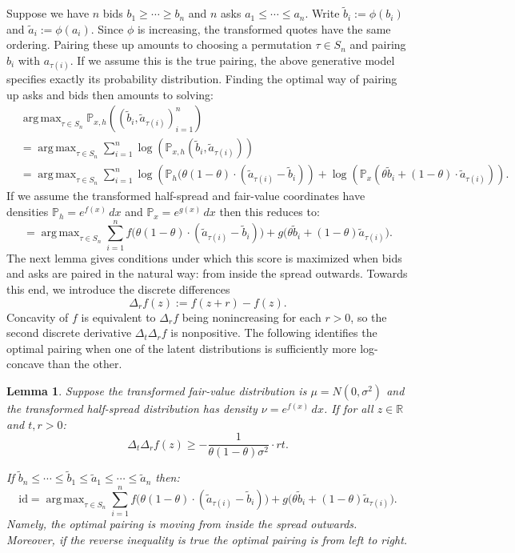 \documentclass[11pt]{article}
\theoremstyle{plain}
\newtheorem{lemma}[theorem]{Lemma}
\theoremstyle{definition}
\numberwithin{equation}{section}
\newcommand{\R}{\mathbb{R}}
\renewcommand{\P}{\mathbb{P}}
\DeclareMathOperator*{\argmax}{arg\,max}
\begin{document}
Suppose we have $n$ bids $b_1 \geq \cdots \geq b_n$ and $n$ asks $a_1 \leq \cdots \leq a_n$. Write $\widetilde b_i:=\phi(b_i)$ and $\widetilde a_i:=\phi(a_i)$. Since $\phi$ is increasing, the transformed quotes have the same ordering. Pairing these up amounts to choosing a permutation $\tau \in S_n$ and pairing $b_i$ with $a_{\tau(i)}$. If we assume this is the true pairing, the above generative model specifies exactly its probability distribution. Finding the optimal way of pairing up asks and bids then amounts to solving:
%
\begin{align*}
    & \argmax_{\tau \in S_n} \P_{x,h}\left((\widetilde b_i, \widetilde a_{\tau(i)})_{i=1}^n\right) \\
    & = \argmax_{\tau \in S_n} \sum_{i=1}^n \log\left(\P_{x,h}(\widetilde b_i, \widetilde a_{\tau(i)})\right) \\
    & = \argmax_{\tau \in S_n} \sum_{i=1}^n \log\left(\P_h(\theta (1-\theta) \cdot (\widetilde a_{\tau(i)} - \widetilde b_i)\right) + \log\left( \P_x(\theta \widetilde b_i + (1-\theta) \cdot \widetilde a_{\tau(i)})\right).
\end{align*}
%
\noindent If we assume the transformed half-spread and fair-value coordinates have densities $\P_h=e^{f(x)}\,dx$ and $\P_x=e^{g(x)}\,dx$ then this reduces to:
%
\[= \argmax_{\tau \in S_n} \sum_{i=1}^n f\Big(\theta(1-\theta) \cdot (\widetilde a_{\tau(i)} - \widetilde b_i) \Big ) + g\Big(\theta \widetilde b_i + (1-\theta) \widetilde a_{\tau(i)}\Big). \]
%
\noindent The next lemma gives conditions under which this score is maximized
when bids and asks are paired in the natural way: from inside the spread
outwards. Towards this end, we introduce the discrete differences
%
\[\Delta_r f(z) := f(z + r) - f(z).\]
%
\noindent Concavity of $f$ is equivalent to $\Delta_r f$ being nonincreasing for
each $r > 0$, so the second discrete derivative $\Delta_t \Delta_r f$ is
nonpositive. The following identifies the optimal pairing when one of the latent
distributions is sufficiently more log-concave than the other.

\begin{lemma}
    Suppose the transformed fair-value distribution is $\mu=N(0,\sigma^2)$ and the transformed half-spread distribution has density $\nu=e^{f(x)}\,dx$. If for all $z \in \R$
    and $t,r > 0$:
    \begin{equation}
         \Delta_t \Delta_r f(z) \geq - \frac{1}{\theta(1-\theta)\sigma^2} \cdot rt.
         \label{eqn:gaussian_concavity_condition}
    \end{equation}

    \noindent If $\widetilde b_n \leq \cdots \leq \widetilde b_1 \leq \widetilde a_1 \leq \cdots \leq \widetilde a_n$ then:
    \[\mathrm{id} = \argmax_{\tau \in S_n} \sum_{i=1}^n f\Big(\theta(1-\theta) \cdot (\widetilde a_{\tau(i)} - \widetilde b_i) \Big ) + g\Big(\theta \widetilde b_i + (1-\theta) \widetilde a_{\tau(i)}\Big). \]
    \noindent Namely, the optimal pairing is moving from inside the spread outwards.
     Moreover, if the reverse inequality is true the optimal pairing is from left to
     right.

    \label{lem:optimal_pairing_bids_and_asks_gaussian}
\end{lemma}
\end{document}

